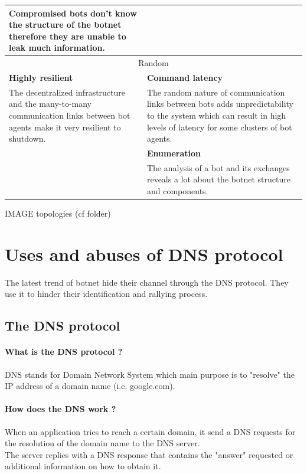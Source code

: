 \begin{tabular}{|p{7cm}|p{7cm}|}
Compromised bots don't know the structure of the botnet therefore they are unable to leak much information.& \\
\hline
\multicolumn{2}{|c|}{Random}\\
\hline
\textbf{Highly resilient} & \textbf{Command latency}\\
The decentralized infrastructure and the many-to-many communication links between bot agents make it very resilient to shutdown. & The random nature of communication links between bots adds unpredictability to the system which can result in high levels of latency for some clusters of bot agents.\\
& \textbf{Enumeration}\\
& The analysis of a bot and its exchanges reveals a lot about the botnet structure and components.\\
\hline
\end{tabular}

IMAGE topologies (cf folder)

\newpage

\cite{phoenix}
\section{Uses and abuses of DNS protocol}
\cite{survey2}
The latest trend of botnet hide their channel through the DNS protocol. They use it to hinder their identification and rallying process.\\

\subsection{The DNS protocol}
\paragraph{What is the DNS protocol ?}
DNS stands for Domain Network System which main purpose is to "resolve" the IP address of a domain name (i.e. google.com).\\

\paragraph{How does the DNS work ?}
When an application tries to reach a certain domain, it send a DNS requests for the resolution of the domain name to the DNS server. \\
The server replies with a DNS response that contains the "answer" requested or additional information on how to obtain it.\\

